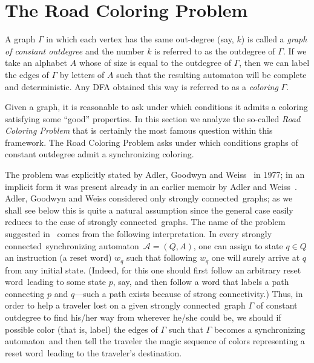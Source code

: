 \documentclass{irmaart}
\newcommand{\san}{synchronizing au\-tom\-a\-ton}
\newcommand{\sw}{reset word}
\newcommand{\scn}{strongly connected}
\theoremstyle{plain}
\begin{document}
\section{The Road Coloring Problem}
\label{KV:sec:rcp}

A graph $\Gamma$ in which each vertex has the same out-degree (say, $k$) is
called a \emph{graph of constant outdegree}
and the number $k$ is referred to as the outdegree of $\Gamma$. If we take an
alphabet $A$ whose of size is equal to the outdegree of $\Gamma$, then we can
label the edges of $\Gamma$ by letters of $A$ such that the resulting automaton
will be complete and deterministic. Any DFA obtained this way is referred to as
a \emph{coloring} $\Gamma$.

Given a graph, it is reasonable to ask under which conditions it admits a
coloring satisfying some ``good'' properties. In this section we analyze the
so-called \emph{Road Coloring Problem} that is
certainly the most famous question within this framework. The Road Coloring
Problem asks under which conditions graphs of constant outdegree admit a
synchronizing coloring.

The problem was explicitly stated by Adler, Goodwyn and
Weiss~\cite{Adler&Goodwyn&Weiss:1977} in 1977; in an implicit form
it was present already in an earlier memoir by Adler and
Weiss~\cite{Adler&Weiss:1970}. Adler, Goodwyn and Weiss considered
only \scn\ graphs; as we shall see below this is quite a natural
assumption since the general case easily reduces to the case of
\scn\ graphs. The name of the problem suggested
in~\cite{Adler&Goodwyn&Weiss:1977} comes from the following
interpretation. In every \scn\ \san\ $\mathcal{A}=(Q,A)$, one can
assign to state $q\in Q$ an instruction (a \sw) $w_q$ such that
following $w_q$ one will surely arrive at $q$ from any initial
state. (Indeed, for this one should first follow an arbitrary \sw\
leading to some state $p$, say, and then follow a word that labels
a path connecting $p$ and $q$---such a path exists because of
strong connectivity.) Thus, in order to help a traveler lost on a
given \scn\ graph $\Gamma$ of constant outdegree to find his/her
way from wherever he/she could be, we should if possible color
(that is, label) the edges of $\Gamma$ such that $\Gamma$ becomes
a \san\ and then tell the traveler the magic sequence of colors
representing a \sw\ leading to the traveler's destination.
\end{document}
